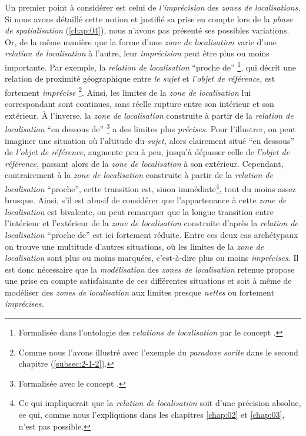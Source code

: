 Un premier point à considérer est celui de \emph{l'imprécision} des
\emph{zones de localisations.} Si nous avons détaillé cette notion et
justifié sa prise en compte lors de la \emph{phase de spatialisation}
(\autoref{chap:04}), nous n'avons pas présenté ses possibles
variations. Or, de la même manière que la forme d'une \emph{zone de
  localisation} varie d'une \emph{relation de localisation} à l'autre,
leur \emph{imprécision} peut être plus ou moins importante. Par
exemple, la \emph{relation de localisation} \enquote{proche de}
\footnote{Formalisée dans l'ontologie des r\emph{elations de
    localisation} par le concept .}, qui décrit
une relation de proximité géographique entre \emph{le sujet} et
\emph{l'objet de référence,} est fortement \emph{imprécise}
\footnote{Comme nous l'avons illustré avec l'exemple du \emph{paradoxe
    sorite} dans le second chapitre (\autoref{subsec:2-1-2}).}. Ainsi,
les limites de la \emph{zone de localisation} lui correspondant sont
continues, sans réelle rupture entre son intérieur et son extérieur. À
l'inverse, la \emph{zone de localisation} construite à partir de la
\emph{relation de localisation} \enquote{en dessous de}
\footnote{Formalisée avec le concept
  .} a des limites plus
\emph{précises.} Pour l'illustrer, on peut imaginer une situation où
l'altitude du \emph{sujet,} alors clairement situé \enquote{en
  dessous} de \emph{l'objet de référence}, augmente peu à peu, jusqu'à
dépasser celle de \emph{l'objet de référence,} passant alors de la
\emph{zone de localisation} à son extérieur. Cependant, contrairement
à la \emph{zone de localisation} construite à partir de la
\emph{relation de localisation} \enquote{proche}, cette transition
est, sinon immédiate\footnote{Ce qui impliquerait que la
  \emph{relation de localisation} soit d'une précision absolue, ce
  qui, comme nous l'expliquions dans les chapitres \ref{chap:02} et
  \ref{chap:03}, n'est pas possible.}, tout du moins assez
brusque. Ainsi, s'il est abusif de considérer que l'appartenance à
cette \emph{zone de localisation} est bivalente, on peut remarquer que
la longue transition entre l'intérieur et l'extérieur de la \emph{zone
  de localisation} construite d'après la \emph{relation de
  localisation} \enquote{proche de} est ici fortement réduite. Entre
ces deux cas archétypaux on trouve une multitude d'autres situations,
où les limites de la \emph{zone de localisation} sont plus ou moins
marquées, c'est-à-dire plus ou moins \emph{imprécises.} Il est donc
nécessaire que la \emph{modélisation} des \emph{zones de localisation}
retenue propose une prise en compte satisfaisante de ces différentes
situations et soit à même de modéliser des \emph{zones de
  localisation} aux limites presque \emph{nettes} ou fortement
\emph{imprécises.}

